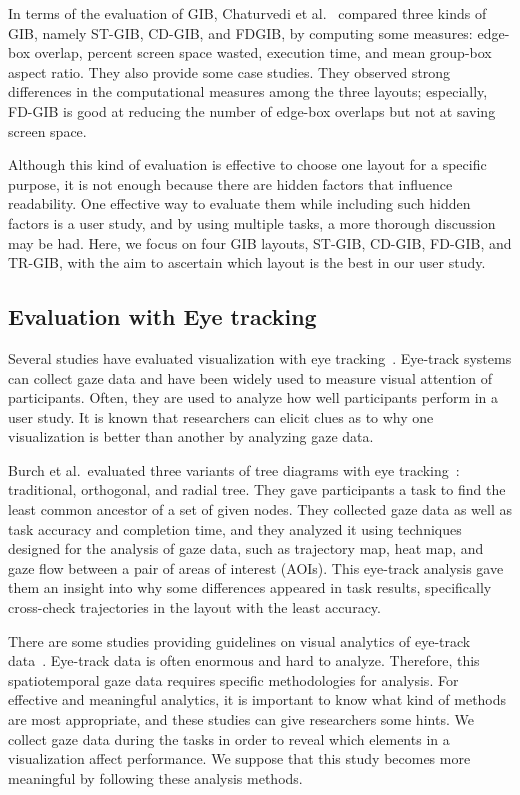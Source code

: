 \documentclass[review]{vgtc}                 %
\begin{document}
In terms of the evaluation of GIB, Chaturvedi et al.~\cite{chaturvedi2014group} compared three kinds of GIB, namely ST-GIB, CD-GIB, and FDGIB, by computing some measures: edge-box overlap, percent screen space wasted, execution time, and mean group-box aspect ratio. They also provide some case studies. They observed strong differences in the computational measures among the three layouts; especially, FD-GIB is good at reducing the number of edge-box overlaps but not at saving screen space.

Although this kind of evaluation is effective to choose one layout for a specific purpose, it is not enough because there are hidden factors that influence readability. One effective way to evaluate them while including such hidden factors is a user study, and by using multiple tasks, a more thorough discussion may be had.
Here, we focus on four GIB layouts, ST-GIB, CD-GIB, FD-GIB, and TR-GIB, with the aim to ascertain which layout is the best in our user study.

\subsection{Evaluation with Eye tracking}
Several studies have evaluated visualization with eye tracking~\cite{burch2011evaluation,pohl2009comparing,netzel2014comparative,jianu2014display,7539393}. Eye-track systems can collect gaze data and have been widely used to measure visual attention of participants. Often, they are used to analyze how well participants perform in a user study. It is known that researchers can elicit clues as to why one visualization is better than another by analyzing gaze data.

Burch et al.\ evaluated three variants of tree diagrams with eye tracking~\cite{burch2011evaluation}: traditional, orthogonal, and radial tree. They gave participants a task to find the least common ancestor of a set of given nodes. They collected gaze data as well as task accuracy and completion time, and they analyzed it using techniques designed for the analysis of gaze data, such as trajectory map, heat map, and gaze flow between a pair of areas of interest (AOIs). This eye-track analysis gave them an insight into why some differences appeared in task results, specifically cross-check trajectories in the layout with the least accuracy.

There are some studies providing guidelines on visual analytics of eye-track data~\cite{andrienko2012visual,kurzhals2014evaluating,duchowski2007eye}.
Eye-track data is often enormous and hard to analyze. Therefore, this spatiotemporal gaze data requires specific methodologies for analysis.
For effective and meaningful analytics, it is important to know what kind of methods are most appropriate, and these studies can give researchers some hints.
We collect gaze data during the tasks in order to reveal which elements in a visualization affect performance. We suppose that this study becomes more meaningful by following these analysis methods.
\end{document}

